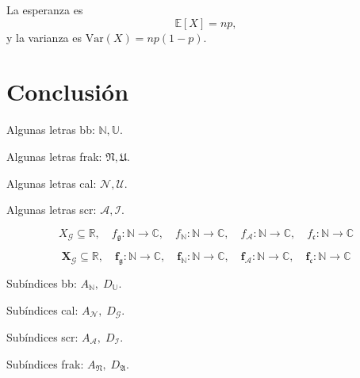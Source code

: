 La esperanza es
\begin{equation}
	\mathbb{E}[X] = np,
\end{equation}
y la varianza es $\mathrm{Var}(X) = np(1-p)$.

\lipsum[11-12]

\section{Conclusión}
\lipsum[13-14]

Algunas letras bb: $\mathbb{N},\mathbb{U}$.

Algunas letras frak: $\mathfrak{N},\mathfrak{U}$.

Algunas letras cal: $\mathcal{N},\mathcal{U}$.

Algunas letras scr: $\mathscr{A},\mathscr{I}$.

\[
	X_{\mathcal{G}} \subseteq \mathbb{R},\quad
	f_{\mathfrak{g}} : \mathbb{N} \to \mathbb{C},\quad
	f_{\mathbb{N}} : \mathbb{N} \to \mathbb{C},\quad
	f_{\mathscr{A}} : \mathbb{N} \to \mathbb{C},\quad
	f_{\mathfrak{c}} : \mathbb{N} \to \mathbb{C}
\]

$$ \mathbf{ X_{\mathcal{G}} \subseteq \mathbb{R},\quad
		f_{\mathfrak{g}} : \mathbb{N} \to \mathbb{C},\quad
		f_{\mathbb{N}} : \mathbb{N} \to \mathbb{C},\quad
		f_{\mathscr{A}} : \mathbb{N} \to \mathbb{C},\quad
		f_{\mathfrak{c}} : \mathbb{N} \to \mathbb{C} }$$

Subíndices bb: $A_{\mathbb{N}},\; D_{\mathbb{U}}$.

Subíndices cal: $A_{\mathcal{N}},\; D_{\mathcal{G}}$.

Subíndices scr: $A_{\mathscr{A}},\; D_{\mathscr{I}}$.

Subíndices frak: $A_{\mathfrak{N}},\; D_{\mathfrak{A}}$.